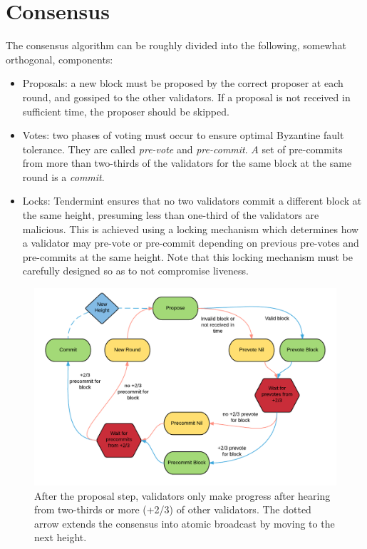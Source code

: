 \section{Consensus}

The consensus algorithm can be roughly divided into the following, somewhat orthogonal, components:

\begin{itemize}

\item{Proposals: a new block must be proposed by the correct proposer at each round, and gossiped to the other validators. If a proposal is not received in sufficient time, the proposer should be skipped.}

\item{Votes: two phases of voting must occur to ensure optimal Byzantine fault tolerance. They are called \emph{pre-vote} and \emph{pre-commit}. $A$ set of pre-commits from more than two-thirds of the validators for the same block at the same round is a \emph{commit}.}

\item{Locks: Tendermint ensures that no two validators commit a different block at the same height, presuming less than one-third of the validators are malicious. This is achieved using a locking mechanism which determines how a validator may pre-vote or pre-commit depending on previous pre-votes and pre-commits at the same height. Note that this locking mechanism must be carefully designed so as to not compromise liveness.}

\end{itemize}

\begin{figure}[]
	\includegraphics[width=\linewidth,height=\textheight,keepaspectratio]{figures/diagrams/consensus_logic.png}
    	\centering
	\caption[Overview of Tendermint consensus logic]{
After the proposal step, validators only make progress after hearing from two-thirds or more (+2/3) of other validators. The dotted arrow extends the consensus into atomic broadcast by moving to the next height.}
	\label{fig:consensus_logic}
\end{figure}


